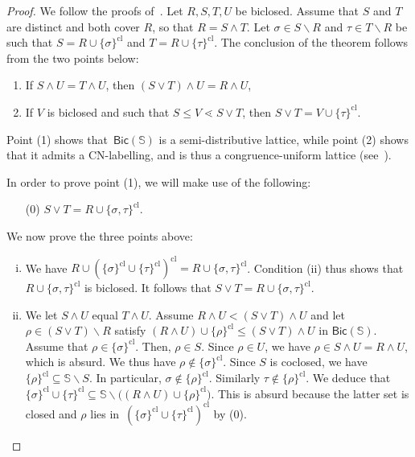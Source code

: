 \documentclass{amsart}
\theoremstyle{definition}
\newcommand{\cS}{\mathbb{S}} %
\newcommand{\ssm}{\smallsetminus} %
\newcommand{\closure}[1]{#1^{\mathrm{cl}}} %
\newcommand{\Bicl}[1]{\mathsf{Bic}(#1)} %
\begin{document}
\begin{proof}
We follow the proofs of~\cite[Thm.~5.2 \& Thm.~5.5]{McConville}. 
Let $R,S,T,U$ be biclosed.
Assume that $S$ and $T$ are distinct and both cover $R$, so that $R = S \wedge T$.
Let $\sigma \in S\ssm R$ and $\tau \in T \ssm R$ be such that $S = R \cup \closure{\{\sigma\}}$ and $T = R \cup \closure{\{\tau\}}$.
The conclusion of the theorem follows from the two points below:
\begin{enumerate}
 \item If $S \wedge U = T \wedge U$, then $(S\vee T) \wedge U = R \wedge U$,
 \item If $V$ is biclosed and such that $S \leq V \lessdot S \vee T$, then $S\vee T = V \cup \closure{\{\tau\}}$.
\end{enumerate}
Point (1) shows that~$\Bicl{\cS}$ is a semi-distributive lattice, while point (2) shows that it admits a CN-labelling, and is thus a congruence-uniform lattice (see~\cite[Thm.~4]{Reading-HyperplaneArrangement}).

In order to prove point (1), we will make use of the following:
\begin{itemize}
 \item[(0)] $S\vee T = R\cup\closure{\{\sigma,\tau\}}$.
\end{itemize}

We now prove the three points above:

\begin{enumerate}[(i)]
\item We have $R \cup \closure{(\closure{\{\sigma\}} \cup \closure{\{\tau\}} )} =   R \cup \closure{\{\sigma,\tau\}}$.
Condition (ii) thus shows that $R \cup \closure{\{\sigma,\tau\}}$ is biclosed.
It follows that $S\vee T = R \cup \closure{\{\sigma,\tau\}}$.

\item We let $S\wedge U$ equal $T\wedge U$. Assume $R\wedge U < (S\vee T)\wedge U$ and let $\rho \in (S\vee T) \ssm R$ satisfy $(R\wedge U) \cup \closure{\{\rho\}} \leq (S\vee T)\wedge U$ in $\Bicl{\cS}$.
Assume that $\rho\in\closure{\{\sigma\}}$.
Then, $\rho\in S$.
Since $\rho\in U$, we have ${\rho \in S \wedge U = R \wedge U}$, which is absurd.
We thus have $\rho \notin \closure{\{\sigma\}}$.
Since $S$ is coclosed, we have $\closure{\{\rho\}} \subseteq \cS\ssm S$.
In particular, $\sigma \notin \closure{\{\rho\}}$.
Similarly $\tau \notin \closure{\{\rho\}}$.
We deduce that ${\closure{\{\sigma\}} \cup \closure{\{\tau\}} \subseteq \cS\ssm \big( (R\wedge U) \cup \closure{\{\rho\}} \big)}$.
This is absurd because the latter set is closed and $\rho$ lies in~$\closure{( \closure{\{\sigma\}} \cup \closure{\{\tau\}} )}$ by (0).


\end{enumerate}
\end{proof}
\end{document}
